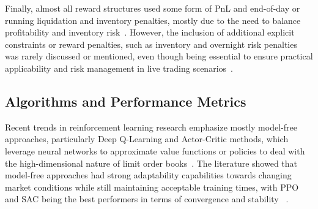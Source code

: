 Finally, almost all reward structures used some form of PnL and end-of-day or running liquidation and inventory penalties,
mostly due to the need to balance profitability and inventory risk~\cite{sun2020marketmaking, gasperov2021marketmaking}.
However, the inclusion of additional explicit constraints or reward penalties, such as inventory and overnight risk penalties was rarely discussed or mentioned,
even though being essential to ensure practical applicability and risk management in live trading scenarios~\cite{jerome2022modelbased, selser2021optimal}.

\subsection{Algorithms and Performance Metrics}
\label{subsec:algorithms-and-performance-metrics}
Recent trends in reinforcement learning research emphasize mostly model-free approaches, particularly Deep Q-Learning and Actor-Critic methods,
which leverage neural networks to approximate value functions or policies to deal with the high-dimensional nature of limit order books~\cite{patel2018optimizing, ganesh2019reinforcement}.
The literature showed that model-free approaches had strong adaptability capabilities towards changing market conditions
while still maintaining acceptable training times, with PPO and SAC being the best performers in terms of convergence and stability ~\cite{sun2020marketmaking, gasperov2021marketmaking}.

